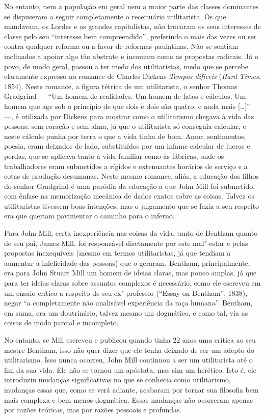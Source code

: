No entanto, nem a população em geral nem a maior parte das classes
dominantes se dispuseram a seguir completamente o receituário
utilitarista. Os que mandavam, os Lordes e os grandes capitalistas, não
trocaram os seus interesses de classe pelo seu ``interesse bem
compreendido'', preferindo o mais das vezes ou ser contra qualquer
reforma ou a favor de reformas paulatinas. Não se sentiam inclinados a
apoiar algo tão abstrato e incomum como as propostas radicais. Já o
povo, de modo geral, passou a ter medo dos utilitaristas, medo que se
percebe claramente expresso no romance de Charles Dickens
\textit{Tempos difíceis} (\textit{Hard Times}, 1854). Neste romance, a figura tétrica de um
utilitarista, o senhor Thomas Gradgrind --- ``Um homem de
realidades. Um homem de fatos e cálculos. Um homem que age sob o
princípio de que dois e dois são quatro, e nada mais [\ldots]'' ---, é utilizada por
Dickens para mostrar como o utilitarismo chegava à vida das pessoas:
sem coração e sem alma, já que o utilitarista só conseguia calcular, e
neste cálculo punha por terra o que a vida tinha de bom. Amor,
sentimentos, poesia, eram deixados de lado, substituídos por um infame
calcular de lucros e perdas, que se aplicava tanto à vida familiar como
às fábricas, onde os trabalhadores eram submetidos a rígidos e
extenuantes horários de serviço e a cotas de produção desumanas. Neste
mesmo romance, aliás, a educação dos filhos do senhor Gradgrind é uma
paródia da educação a que John Mill foi submetido, com ênfase na
memorização mecânica de dados exatos sobre as coisas. Talvez os
utilitaristas tivessem boas intenções, mas o julgamento que se fazia a
seu respeito era que queriam pavimentar o caminho para o inferno. 

Para John Mill, certa inexperiência nas coisas da vida, tanto de 
Bentham quanto de seu pai, James Mill, foi responsável diretamente 
por este mal"-estar e pelas propostas inexequíveis (mesmo em termos 
utilitaristas, já que tendiam a aumentar a infelicidade das pessoas)
que o geraram. Bentham, principalmente, era para John Stuart Mill um homem
de ideias claras, mas pouco amplas, já que para ter ideias claras sobre
assuntos complexos é necessário, como ele escreveu em um ensaio crítico
a respeito de seu ex"-professor (``Essay on Bentham'', 1838),
negar ``a completamente não analisável experiência da raça humana''.
Bentham, em suma, era um doutrinário, talvez mesmo um dogmático, e como
tal, via as coisas de modo parcial e incompleto.

No entanto, se Mill escreveu e publicou quando tinha 22 anos
uma crítica ao seu mestre Bentham, isso não quer dizer que 
ele tenha  deixado de ser um adepto do utilitarismo. Isso nunca ocorreu,
John Mill continuou a ser um utilitarista até o fim da sua vida. Ele
não se tornou um apóstata, mas sim um herético. Isto é, ele introduziu
mudanças significativas no que se conhecia como utilitarismo, mudanças essas
que, como se verá adiante, acabaram por tornar sua filosofia bem mais
complexa e bem menos \mbox{dogmática}. Essas mudanças não ocorreram apenas por
razões teóricas, mas por razões pessoais e profundas.


